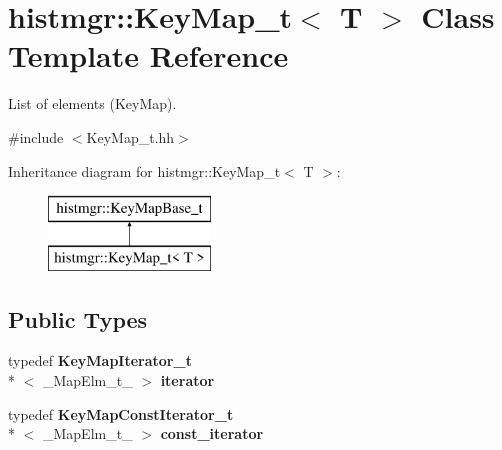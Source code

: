 \section{histmgr\-:\-:Key\-Map\-\_\-t$<$ T $>$ Class Template Reference}
\label{classhistmgr_1_1KeyMap__t}


List of elements (Key\-Map).  




{\ttfamily \#include $<$Key\-Map\-\_\-t.\-hh$>$}

Inheritance diagram for histmgr\-:\-:Key\-Map\-\_\-t$<$ T $>$\-:\begin{figure}[H]
\begin{center}
\leavevmode
\includegraphics[height=2.000000cm]{classhistmgr_1_1KeyMap__t}
\end{center}
\end{figure}
\subsection*{Public Types}
\begin{DoxyCompactItemize}
\item 
typedef {\bf Key\-Map\-Iterator\-\_\-t}\\*
$<$ \-\_\-\-Map\-Elm\-\_\-t\-\_\- $>$ {\bfseries iterator}\label{classhistmgr_1_1KeyMap__t_a36f08060446052445a89c1ab95a93c49}

\item 
typedef {\bf Key\-Map\-Const\-Iterator\-\_\-t}\\*
$<$ \-\_\-\-Map\-Elm\-\_\-t\-\_\- $>$ {\bfseries const\-\_\-iterator}\label{classhistmgr_1_1KeyMap__t_ae16884e84c02259cff1074864660d304}

\end{DoxyCompactItemize}
